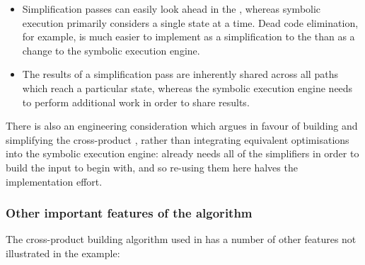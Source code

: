 \begin{itemize}
\item Simplification passes can easily look ahead in the
  {\StateMachine}, whereas symbolic execution primarily considers a
  single state at a time.  Dead code elimination, for example, is much
  easier to implement as a simplification to the {\StateMachine} than
  as a change to the symbolic execution engine.
\item The results of a simplification pass are inherently shared
  across all paths which reach a particular state, whereas the
  symbolic execution engine needs to perform additional work in order
  to share results.
\end{itemize}

There is also an engineering consideration which argues in favour of
building and simplifying the cross-product {\StateMachine}, rather
than integrating equivalent optimisations into the symbolic execution
engine: {\technique} already needs all of the simplifiers in order to
build the input {\StateMachines} to begin with, and so re-using them
here halves the implementation effort.

\subsubsection{Other important features of the algorithm}

The cross-product building algorithm used in {\implementation} has a
number of other features not illustrated in the example:

